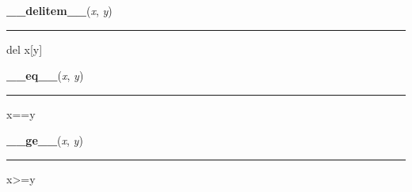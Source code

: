     \label{dict:__delitem__}

    \vspace{0.5ex}

    \begin{boxedminipage}{\textwidth}

    \raggedright \textbf{\_\_delitem\_\_}(\textit{x}, \textit{y})

    \vspace{-1.5ex}

    \rule{\textwidth}{0.5\fboxrule}
    del x[y]

    \vspace{1ex}

    \end{boxedminipage}

    \label{dict:__eq__}

    \vspace{0.5ex}

    \begin{boxedminipage}{\textwidth}

    \raggedright \textbf{\_\_eq\_\_}(\textit{x}, \textit{y})

    \vspace{-1.5ex}

    \rule{\textwidth}{0.5\fboxrule}
    x==y

    \vspace{1ex}

    \end{boxedminipage}

    \label{dict:__ge__}

    \vspace{0.5ex}

    \begin{boxedminipage}{\textwidth}

    \raggedright \textbf{\_\_ge\_\_}(\textit{x}, \textit{y})

    \vspace{-1.5ex}

    \rule{\textwidth}{0.5\fboxrule}
    x{\textgreater}=y

    \vspace{1ex}

    \end{boxedminipage}

    \vspace{0.5ex}

